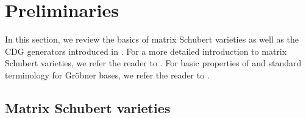 \section{Preliminaries}\label{sect:prelim}

In this section, we review the basics of matrix Schubert varieties as well as the CDG generators introduced in \cite{HPW}.  For a more detailed introduction to matrix Schubert varieties, we refer the reader to \cite[Chapter 10]{Ful96}.  For basic properties of and standard terminology for Gr\"obner bases, we refer the reader to \cite{Eis95}.  

\subsection{Matrix Schubert varieties}\label{subsect:MSv}

